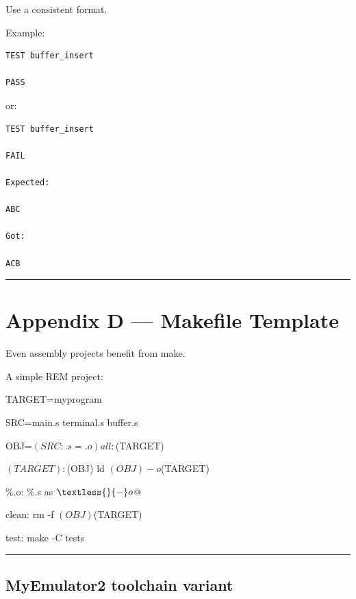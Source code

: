 \documentclass[
  oneside,
  openany]{book}
\newenvironment{Shaded}{\begin{snugshade}}{\end{snugshade}}
\newcommand{\NormalTok}[1]{#1}
\begin{document}
Use a consistent format.

Example:

\begin{verbatim}
TEST buffer_insert

PASS
\end{verbatim}

or:

\begin{verbatim}
TEST buffer_insert

FAIL

Expected:

ABC

Got:

ACB
\end{verbatim}

\begin{center}\rule{0.5\linewidth}{0.5pt}\end{center}

\hypertarget{appendix-d-makefile-template}{%
\chapter{Appendix D --- Makefile
Template}\label{appendix-d-makefile-template}}

Even assembly projects benefit from make.

A simple REM project:

\begin{Shaded}
\begin{Highlighting}[]
\NormalTok{TARGET=myprogram}


\NormalTok{SRC=main.s terminal.s buffer.s}


\NormalTok{OBJ=$(SRC:.s=.o)}


\NormalTok{all: $(TARGET)}


\NormalTok{$(TARGET): $(OBJ)}
\NormalTok{    ld $(OBJ) {-}o $(TARGET)}


\NormalTok{\%.o: \%.s}
\NormalTok{    as $\textless{} {-}o $@}


\NormalTok{clean:}
\NormalTok{    rm {-}f $(OBJ) $(TARGET)}


\NormalTok{test:}
\NormalTok{    make {-}C tests}
\end{Highlighting}
\end{Shaded}

\begin{center}\rule{0.5\linewidth}{0.5pt}\end{center}

\hypertarget{myemulator2-toolchain-variant}{%
\section{MyEmulator2 toolchain
variant}\label{myemulator2-toolchain-variant}}
\end{document}
